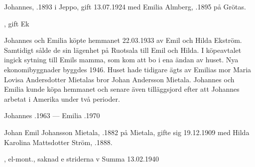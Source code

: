 
%
Johannes, .1893 i Jeppo,  gift 13.07.1924 med Emilia Almberg, .1895 på Grötas.
\begin{jhchildren}
  \item {}
  \item {}, gift Ek
\end{jhchildren}

Johannes och Emilia köpte hemmanet 22.03.1933 av Emil och Hilda Ekström. Samtidigt sålde de sin lägenhet på  Ruotsala till Emil och Hilda. I köpeavtalet ingick sytning till Emils mamma, som kom att bo i ena ändan av huset. Nya ekonomibyggnader byggdes 1946. Huset hade tidigare ägts av Emilias mor Maria Lovisa Andersdotter Mietalas bror Johan Andersson Mietala. Johannes och Emilia kunde köpa hemmanet och senare även tilläggsjord efter att Johannes arbetat i Amerika under två perioder.

Johannes .1963  ---  Emilia .1970


%
Johan Emil Johansson Mietala, .1882 på Mietala, gifte sig 19.12.1909  med Hilda Karolina Mattsdotter Ström, .1888.
\begin{jhchildren}
  \item {}
  \item {}, el-mont., saknad e striderna v Summa 13.02.1940
  \item {}
  \item {}
  \item {}
  \item {}
  \item {}
  \item {}
  \item {}
  \item {}
\end{jhchildren}

